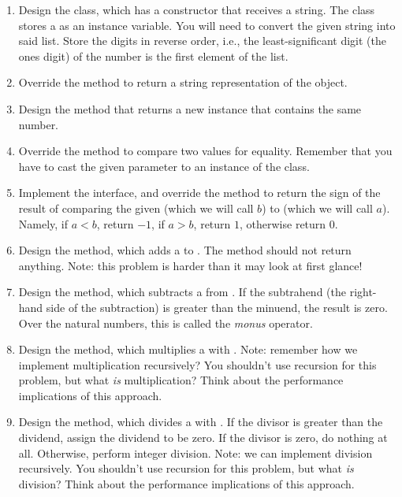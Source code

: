 \begin{enumerate}[label=(\alph*)]
    \item Design the  class, which has a constructor that receives a string. The  class stores a  as an instance variable. You will need to convert the given string into said list. Store the digits in reverse order, i.e., the least-significant digit (the ones digit) of the number is the first element of the list.
    \item Override the  method to return a string representation of the  object. 
    \item Design the  method that returns a new  instance that contains the same number.
    \item Override the  method to compare two  values for equality. Remember that you have to cast the given parameter to an instance of the  class. 
    \item Implement the  interface, and override the  method to return the sign of the result of comparing the given  (which we will call $b$) to   (which we will call $a$). Namely, if $a < b$, return $-1$, if $a > b$, return $1$, otherwise return $0$.
    \item Design the  method, which adds a  to  . The method should not return anything. Note: this problem is harder than it may look at first glance!
    \item Design the  method, which subtracts a  from  . If the subtrahend (the right-hand side of the subtraction) is greater than the minuend, the result is zero. Over the natural numbers, this is called the \emph{monus} operator.
    \item Design the  method, which multiplies a  with  . Note: remember how we implement multiplication recursively? You shouldn't use recursion for this problem, but what \emph{is} multiplication? Think about the performance implications of this approach.
    \item Design the  method, which divides a  with  . If the divisor is greater than the dividend, assign the dividend to be zero. If the divisor is zero, do nothing at all. Otherwise, perform integer division. Note: we can implement division recursively. You shouldn't use recursion for this problem, but what \emph{is} division? Think about the performance implications of this approach.
\end{enumerate}

